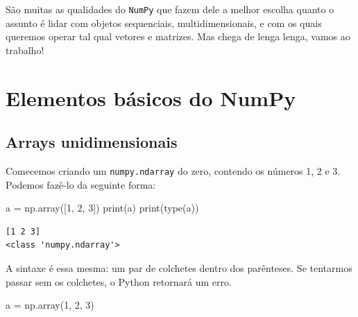 \documentclass[
  brazilian,
  letterpaper,
  DIV=11,
  numbers=noendperiod]{scrreprt}
\newenvironment{Shaded}{\begin{snugshade}}{\end{snugshade}}
\newcommand{\BuiltInTok}[1]{\textcolor[rgb]{0.00,0.23,0.31}{#1}}
\newcommand{\DecValTok}[1]{\textcolor[rgb]{0.68,0.00,0.00}{#1}}
\newcommand{\NormalTok}[1]{\textcolor[rgb]{0.00,0.23,0.31}{#1}}
\newcommand{\OperatorTok}[1]{\textcolor[rgb]{0.37,0.37,0.37}{#1}}
\begin{document}
São muitas as qualidades do \texttt{NumPy} que fazem dele a melhor
escolha quanto o assunto é lidar com objetos sequenciais,
multidimensionais, e com os quais queremos operar tal qual vetores e
matrizes. Mas chega de lenga lenga, vamos ao trabalho!

\section{Elementos básicos do
NumPy}\label{elementos-buxe1sicos-do-numpy}

\subsection{Arrays unidimensionais}\label{arrays-unidimensionais}

Comecemos criando um \texttt{numpy.ndarray} do zero, contendo os números
1, 2 e 3. Podemos fazê-lo da seguinte forma:

\begin{Shaded}
\begin{Highlighting}[]
\NormalTok{a }\OperatorTok{=}\NormalTok{ np.array([}\DecValTok{1}\NormalTok{, }\DecValTok{2}\NormalTok{, }\DecValTok{3}\NormalTok{])}
\BuiltInTok{print}\NormalTok{(a)}
\BuiltInTok{print}\NormalTok{(}\BuiltInTok{type}\NormalTok{(a))}
\end{Highlighting}
\end{Shaded}

\begin{verbatim}
[1 2 3]
<class 'numpy.ndarray'>
\end{verbatim}

A sintaxe é essa mesma: um par de colchetes dentro dos parênteses. Se
tentarmos passar sem os colchetes, o Python retornará um erro.

\begin{Shaded}
\begin{Highlighting}[]
\NormalTok{a }\OperatorTok{=}\NormalTok{ np.array(}\DecValTok{1}\NormalTok{, }\DecValTok{2}\NormalTok{, }\DecValTok{3}\NormalTok{)}
\end{Highlighting}
\end{Shaded}
\end{document}
